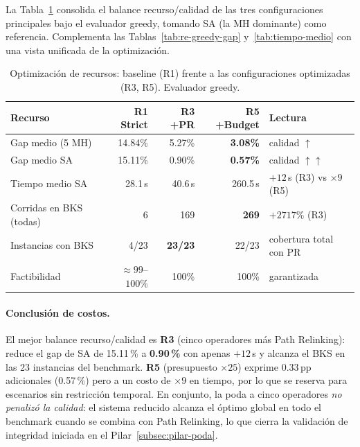 \documentclass[11pt,a4paper]{article}
\theoremstyle{definition}
\theoremstyle{remark}
\begin{document}
La Tabla~\ref{tab:optimizacion-recursos} consolida el balance
recurso/calidad de las tres configuraciones principales bajo el evaluador
greedy, tomando SA (la MH dominante) como referencia. Complementa las
Tablas~\ref{tab:re-greedy-gap} y~\ref{tab:tiempo-medio} con una vista
unificada de la optimización.

\begin{table}[h]
\centering
\caption{Optimización de recursos: baseline (R1) frente a las
         configuraciones optimizadas (R3, R5). Evaluador greedy.}
\label{tab:optimizacion-recursos}
\small
\begin{tabular}{lrrrl}
\toprule
Recurso & R1 Strict & R3 +PR & R5 +Budget & Lectura \\
\midrule
Gap medio (5 MH)        & 14.84\% & 5.27\%  & \textbf{3.08\%} & calidad $\uparrow$ \\
Gap medio SA            & 15.11\% & 0.90\%  & \textbf{0.57\%} & calidad $\uparrow\uparrow$ \\
Tiempo medio SA         & 28.1\,s & 40.6\,s & 260.5\,s & $+12$\,s (R3) vs $\times 9$ (R5) \\
Corridas en BKS (todas) & 6       & 169     & \textbf{269} & $+2717\%$ (R3) \\
Instancias con BKS      & 4/23    & \textbf{23/23} & 22/23 & cobertura total con PR \\
Factibilidad            & $\approx 99$--$100\%$ & 100\% & 100\% & garantizada \\
\bottomrule
\end{tabular}
\end{table}

\paragraph{Conclusión de costos.}
El mejor balance recurso/calidad es \textbf{R3} (cinco operadores más Path
Relinking): reduce el gap de SA de 15.11\,\% a \textbf{0.90\,\%} con apenas
$+12$\,s y alcanza el BKS en las 23 instancias del benchmark.
\textbf{R5} (presupuesto $\times 25$) exprime 0.33\,pp adicionales
(0.57\,\%) pero a un costo de $\times 9$ en tiempo, por lo que se reserva
para escenarios sin restricción temporal. En conjunto, la poda a cinco
operadores \emph{no penalizó la calidad}: el sistema reducido alcanza el
óptimo global en todo el benchmark cuando se combina con Path Relinking, lo
que cierra la validación de integridad iniciada en el
Pilar~\ref{subsec:pilar-poda}.


\end{document}
